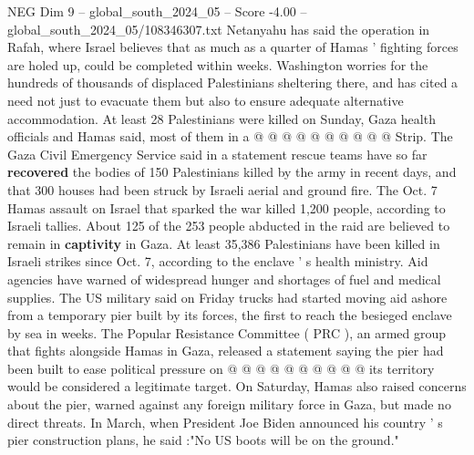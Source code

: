 \begin{textsample}{NEG Dim 9 – global\_south\_2024\_05 – Score -4.00 – global\_south\_2024\_05/108346307.txt}
Netanyahu has said the operation in Rafah, where Israel believes that as much as a quarter of Hamas ' fighting forces are holed up, could be completed within weeks.
Washington worries for the hundreds of thousands of displaced Palestinians sheltering there, and has cited a need not just to evacuate them but also to ensure adequate alternative accommodation.
At least 28 Palestinians were killed on Sunday, Gaza health officials and Hamas said, most of them in a @ @ @ @ @ @ @ @ @ @ Strip.
The Gaza Civil Emergency Service said in a statement rescue teams have so far \textbf{recovered} the bodies of 150 Palestinians killed by the army in recent days, and that 300 houses had been struck by Israeli aerial and ground fire.
The Oct. 7 Hamas assault on Israel that sparked the war killed 1,200 people, according to Israeli tallies.
About 125 of the 253 people abducted in the raid are believed to remain in \textbf{captivity} in Gaza.
At least 35,386 Palestinians have been killed in Israeli strikes since Oct. 7, according to the enclave ' s health ministry.
Aid agencies have warned of widespread hunger and shortages of fuel and medical supplies.
The US military said on Friday trucks had started moving aid ashore from a temporary pier built by its forces, the first to reach the besieged enclave by sea in weeks.
The Popular Resistance Committee ( PRC ), an armed group that fights alongside Hamas in Gaza, released a statement saying the pier had been built to ease political pressure on @ @ @ @ @ @ @ @ @ @ its territory would be considered a legitimate target.
On Saturday, Hamas also raised concerns about the pier, warned against any foreign military force in Gaza, but made no direct threats.
In March, when President Joe Biden announced his country ' s pier construction plans, he said :"No US boots will be on the ground."

\end{textsample}
